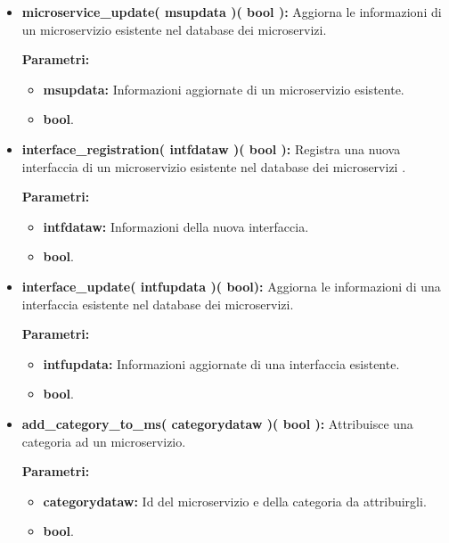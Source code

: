 \begin{itemize}
\begin{itemize}
			\item \textbf{microservice\_update( msupdata )( bool ):} Aggiorna le informazioni di un microservizio esistente nel database dei microservizi.
				\begin{description}
    				\item[\textbf{Parametri:}]
				\end{description}
				\begin{itemize}
					\item \textbf{msupdata:} Informazioni aggiornate di un microservizio esistente.
					\item \textbf{bool}.
				\end{itemize}
				
			\item \textbf{interface\_registration( intfdataw )( bool ):} Registra una nuova interfaccia di un microservizio esistente nel database dei microservizi .
				\begin{description}
    				\item[\textbf{Parametri:}]
				\end{description}
				\begin{itemize}
					\item \textbf{intfdataw:} Informazioni della nuova interfaccia.
					\item \textbf{bool}.
				\end{itemize}
				
			\item \textbf{interface\_update( intfupdata )( bool):} Aggiorna le informazioni di una interfaccia esistente nel database dei microservizi.
				\begin{description}
    				\item[\textbf{Parametri:}]
				\end{description}
				\begin{itemize}
					\item \textbf{intfupdata:} Informazioni aggiornate di una interfaccia esistente.
					\item \textbf{bool}.
				\end{itemize}
				
			\item \textbf{add\_category\_to\_ms( categorydataw )( bool ):} Attribuisce una categoria ad un microservizio.
				\begin{description}
    				\item[\textbf{Parametri:}]
				\end{description}
				\begin{itemize}
					\item \textbf{categorydataw:} Id del microservizio e della categoria da attribuirgli.
					\item \textbf{bool}.
				\end{itemize}
				

\end{itemize}
\end{itemize}
